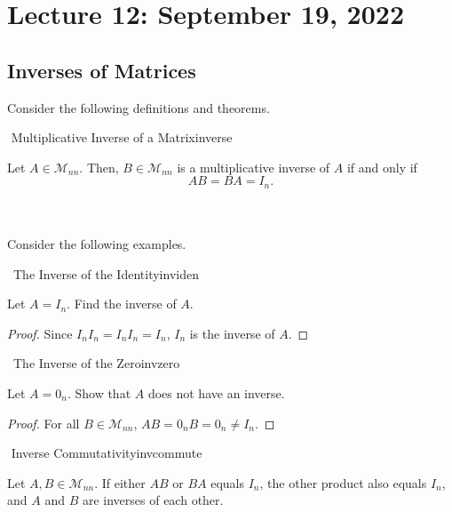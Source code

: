 \pagebreak

\section{Lecture 12: September 19, 2022}

    \subsection{Inverses of Matrices}

        Consider the following definitions and theorems.
        \begin{definition}{\Stop\,\,Multiplicative Inverse of a Matrix}{inverse}

            Let \(A\in\mathcal{M}_{nn}\). Then, \(B\in\mathcal{M}_{nn}\) is a multiplicative inverse of \(A\) if and only if 
            \begin{equation*}
                AB=BA=I_n.
            \end{equation*}
            
        \end{definition}
        \vphantom
        \\
        \\
        Consider the following examples.
        \begin{example}{\Difficulty\,\Difficulty\,\,The Inverse of the Identity}{inviden}

            Let \(A=I_n\). Find the inverse of \(A\).
            \begin{proof}
                Since \(I_nI_n=I_nI_n=I_n\), \(I_n\) is the inverse of \(A\).
            \end{proof}
            
        \end{example}
        \begin{example}{\Difficulty\,\Difficulty\,\,The Inverse of the Zero}{invzero}

            Let \(A=0_n\). Show that \(A\) does not have an inverse.
            \begin{proof}
                For all \(B\in\mathcal{M}_{nn}\), \(AB=0_nB=0_n\neq I_n\).
            \end{proof}
            
        \end{example}
        \begin{theorem}{\Stop\,\,Inverse Commutativity}{invcommute}
            
            Let \(A,B\in\mathcal{M}_{nn}\). If either \(AB\) or \(BA\) equals \(I_n\), the other product also equals \(I_n\), and \(A\) and \(B\) are inverses of each other.
            
        \end{theorem}
